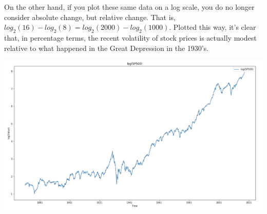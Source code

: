 \documentclass[11pt, oneside]{article}   	%
\begin{document}
On the other hand, if you plot these same data on a log scale, you do no longer consider absolute change, but relative change. That is, $log_2(16) - log_2(8) = log_2(2000) - log_2(1000)$. Plotted this way, it's clear that, in percentage terms, the recent volatility of stock prices is actually modest relative to what happened in the Great Depression in the 1930's.
\begin{center}
	\includegraphics[scale=0.4]{sp500_log.png}
\end{center}
\end{document}
